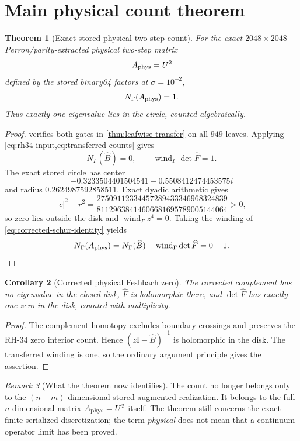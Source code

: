 \documentclass[11pt]{article}
\newtheorem{theorem}{Theorem}[section]
\newtheorem{corollary}[theorem]{Corollary}
\theoremstyle{definition}
\theoremstyle{remark}
\newtheorem{remark}[theorem]{Remark}
\newcommand{\Id}{\mathrm I}
\newcommand{\wind}{\operatorname{wind}}
\newcommand{\Aphys}{A_{\rm phys}}
\begin{document}
\section{Main physical count theorem}
\label{sec:main-theorem}

\begin{theorem}[Exact stored physical two-step count]
\label{thm:physical-count}
For the exact \(2048\times2048\) Perron/parity-extracted physical two-step
matrix
\[
 \Aphys=U^2
\]
defined by the stored binary64 factors at \(\sigma=10^{-2}\),
\begin{equation}
 N_\Gamma(\Aphys)=1.
 \label{eq:physical-count-one}
\end{equation}
Thus exactly one eigenvalue lies in the circle, counted algebraically.
\end{theorem}

\begin{proof}
 verifies both gates in
\cref{thm:leafwise-transfer} on all \(949\) leaves.  Applying
\cref{eq:rh34-input,eq:transferred-counts} gives
\[
 N_\Gamma(\widehat B)=0,\qquad
 \wind_\Gamma\det\widehat F=1.
\]
The exact stored circle has center
\[
 -0.3233504401504541-0.5508412474453575i
\]
and radius \(0.2624987592858511\).  Exact dyadic arithmetic gives
\[
 |c|^2-r^2
 =
 \frac{
 27509112334457289433346968324839
 }{
 81129638414606681695789005144064
 }>0,
\]
so zero lies outside the disk and
\(\wind_\Gamma z^4=0\).  Taking the winding of
\cref{eq:corrected-schur-identity} yields
\[
 N_\Gamma(\Aphys)
 =N_\Gamma(\widehat B)
  +\wind_\Gamma\det\widehat F
 =0+1.
\]
\end{proof}

\begin{corollary}[Corrected physical Feshbach zero]
\label{cor:corrected-zero}
The corrected complement has no eigenvalue in the closed disk,
\(\widehat F\) is holomorphic there, and
\(\det\widehat F\) has exactly one zero in the disk, counted with
multiplicity.
\end{corollary}

\begin{proof}
The complement homotopy excludes boundary crossings and preserves the
RH-34 zero interior count.  Hence
\((z\Id-\widehat B)^{-1}\) is holomorphic in the disk.
The transferred winding is one, so the ordinary argument principle gives
the assertion.
\end{proof}

\begin{remark}[What the theorem now identifies]
\label{rem:what-identifies}
The count no longer belongs only to the \((n+m)\)-dimensional stored
augmented realization.  It belongs to the full \(n\)-dimensional matrix
\(\Aphys=U^2\) itself.  The theorem still concerns the exact finite
serialized discretization; the term \emph{physical} does not mean that a
continuum operator limit has been proved.
\end{remark}
\end{document}
